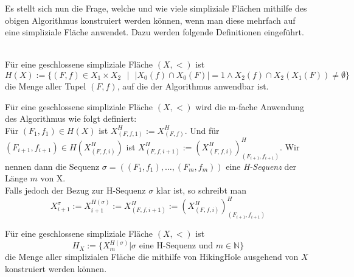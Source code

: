 \documentclass[12pt,titlepage]{article}
\begin{document}
Es stellt sich nun die Frage, welche und wie viele simpliziale Flächen mithilfe des obigen Algorithmus konstruiert werden können, wenn man diese mehrfach auf eine simpliziale Fläche anwendet. Dazu werden folgende Definitionen eingeführt.\\\\
\begin{definition}
Für eine geschlossene simpliziale Fläche $(X,<)$ ist 
\[
H(X):=\{(F,f)\in X_{1}\times X_{2} \text{ }\vert \text{ }\vert X_{0}(f) \cap X_{0}(F)\vert = 1 \land X_2(f) \cap X_2(X_1(F))\neq \emptyset\}
\]
die Menge aller Tupel $(F,f)$, auf die der Algorithmus anwendbar ist.
\end{definition}

\begin{definition}
Für eine geschlossene simpliziale Fläche $(X,<)$ wird die m-fache Anwendung des Algorithmus wie folgt definiert:\\
Für $(F_{1},f_{1})\in H(X) $ ist $X^{H}_{(F,f,1)}:=X^{H}_{(F,f)}$. Und für $(F_{i+1},f_{i+1}) \in H(X^{H}_{(F,f,i)})$ ist $X^{H}_{(F,f,i+1)}:=(X^{H}_{(F,f,i)})^{H}_{(F_{i+1},f_{i+1})}$. Wir nennen dann die Sequenz $\sigma=((F_{1},f_{1}),\ldots,(F_{m},f_{m}))$
eine \emph{H-Sequenz} der Länge $m$ von X.\\
Falls jedoch der Bezug zur H-Sequenz $\sigma$ klar ist, so schreibt man 
\[
X^{\sigma}_{i+1}:=X^{H(\sigma)}_{i+1}:=X^{H}_{(F,f,i+1)}:=(X^{H}_{(F,f,i)})^{H}_{(F_{i+1},f_{i+1})}
\]

\end{definition}

\begin{definition}
Für eine geschlossene simpliziale Fläche $(X,<)$ ist 
\[
H_{X}:=\{X^{H(\sigma)}_{m}\vert \sigma \text{ eine H-Sequenz und } m\in \mathbb{N}\}
\]
die Menge aller simplizialen Fläche die mithilfe von HikingHole ausgehend von $X$ konstruiert werden können.
\end{definition}


%
\end{document}
